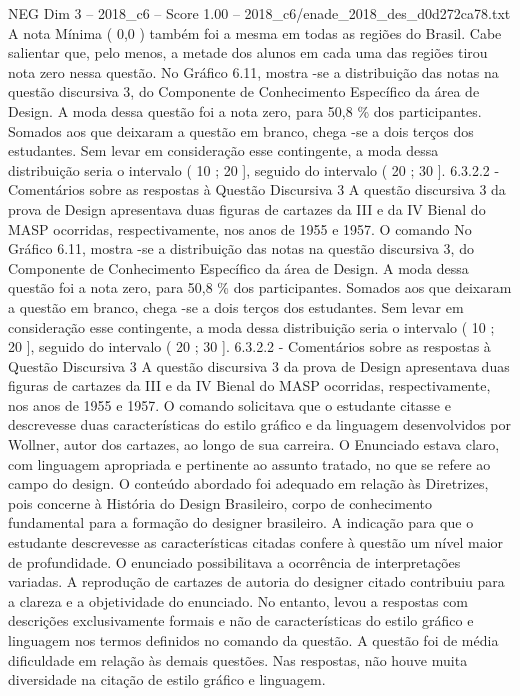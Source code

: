 \begin{textsample}{NEG Dim 3 – 2018\_c6 – Score 1.00 – 2018\_c6/enade\_2018\_des\_d0d272ca78.txt}
A nota Mínima ( 0,0 ) também foi a mesma em todas as regiões do Brasil.
Cabe salientar que, pelo menos, a metade dos alunos em cada uma das regiões tirou nota zero nessa questão.
No Gráfico 6.11, mostra -se a distribuição das notas na questão discursiva 3, do Componente de Conhecimento Específico da área de Design.
A moda dessa questão foi a nota zero, para 50,8 \% dos participantes.
Somados aos que deixaram a questão em branco, chega -se a dois terços dos estudantes.
Sem levar em consideração esse contingente, a moda dessa distribuição seria o intervalo ( 10 ; 20 ], seguido do intervalo ( 20 ; 30 ]. 6.3.2.2 - Comentários sobre as respostas à Questão Discursiva 3 A questão discursiva 3 da prova de Design apresentava duas figuras de cartazes da III e da IV Bienal do MASP ocorridas, respectivamente, nos anos de 1955 e 1957.
O comando No Gráfico 6.11, mostra -se a distribuição das notas na questão discursiva 3, do Componente de Conhecimento Específico da área de Design.
A moda dessa questão foi a nota zero, para 50,8 \% dos participantes.
Somados aos que deixaram a questão em branco, chega -se a dois terços dos estudantes.
Sem levar em consideração esse contingente, a moda dessa distribuição seria o intervalo ( 10 ; 20 ], seguido do intervalo ( 20 ; 30 ]. 6.3.2.2 - Comentários sobre as respostas à Questão Discursiva 3 A questão discursiva 3 da prova de Design apresentava duas figuras de cartazes da III e da IV Bienal do MASP ocorridas, respectivamente, nos anos de 1955 e 1957.
O comando solicitava que o estudante citasse e descrevesse duas características do estilo gráfico e da linguagem desenvolvidos por Wollner, autor dos cartazes, ao longo de sua carreira.
O Enunciado estava claro, com linguagem apropriada e pertinente ao assunto tratado, no que se refere ao campo do design.
O conteúdo abordado foi adequado em relação às Diretrizes, pois concerne à História do Design Brasileiro, corpo de conhecimento fundamental para a formação do designer brasileiro.
A indicação para que o estudante descrevesse as características citadas confere à questão um nível maior de profundidade.
O enunciado possibilitava a ocorrência de interpretações variadas.
A reprodução de cartazes de autoria do designer citado contribuiu para a clareza e a objetividade do enunciado.
No entanto, levou a respostas com descrições exclusivamente formais e não de características do estilo gráfico e linguagem nos termos definidos no comando da questão.
A questão foi de média dificuldade em relação às demais questões.
Nas respostas, não houve muita diversidade na citação de estilo gráfico e linguagem.

\end{textsample}
